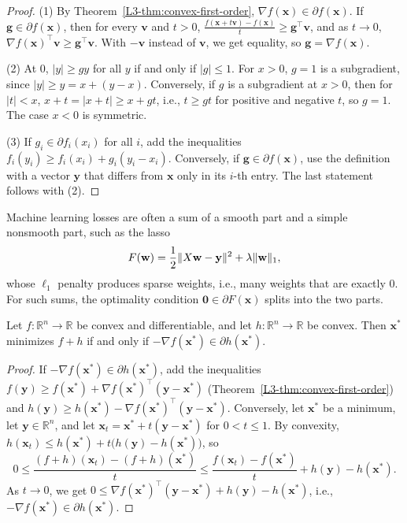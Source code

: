 \begin{proof}
    (1) By Theorem~\ref{L3-thm:convex-first-order}, $\nabla f(\mathbf{x}) \in \partial f(\mathbf{x})$. If $\mathbf{g} \in \partial f(\mathbf{x})$, then for every $\mathbf{v}$ and $t > 0$, $\frac{f(\mathbf{x} + t\mathbf{v}) - f(\mathbf{x})}{t} \geq \mathbf{g}^\top\mathbf{v}$, and as $t \to 0$, $\nabla f(\mathbf{x})^\top\mathbf{v} \geq \mathbf{g}^\top\mathbf{v}$. With $-\mathbf{v}$ instead of $\mathbf{v}$, we get equality, so $\mathbf{g} = \nabla f(\mathbf{x})$.

    (2) At $0$, $|y| \geq gy$ for all $y$ if and only if $|g| \leq 1$. For $x > 0$, $g = 1$ is a subgradient, since $|y| \geq y = x + (y - x)$. Conversely, if $g$ is a subgradient at $x > 0$, then for $|t| < x$, $x + t = |x + t| \geq x + gt$, i.e., $t \geq gt$ for positive and negative $t$, so $g = 1$. The case $x < 0$ is symmetric.

    (3) If $g_i \in \partial f_i(x_i)$ for all $i$, add the inequalities $f_i(y_i) \geq f_i(x_i) + g_i(y_i - x_i)$. Conversely, if $\mathbf{g} \in \partial f(\mathbf{x})$, use the definition with a vector $\mathbf{y}$ that differs from $\mathbf{x}$ only in its $i$-th entry. The last statement follows with (2).
\end{proof}

Machine learning losses are often a sum of a smooth part and a simple nonsmooth part, such as the lasso
\[F(\mathbf{w}) = \frac{1}{2}\lVert X\mathbf{w} - \mathbf{y} \rVert^2 + \lambda\lVert \mathbf{w} \rVert_1,\]
whose $\ell_1$ penalty produces sparse weights, i.e., many weights that are exactly $0$. For such sums, the optimality condition $\mathbf{0} \in \partial F(\mathbf{x})$ splits into the two parts.

\begin{theorem}\label{L3-thm:composite-optimality}
    Let $f: \mathbb{R}^n \to \mathbb{R}$ be convex and differentiable, and let $h: \mathbb{R}^n \to \mathbb{R}$ be convex. Then $\mathbf{x}^*$ minimizes $f + h$ if and only if $-\nabla f(\mathbf{x}^*) \in \partial h(\mathbf{x}^*)$.
\end{theorem}

\begin{proof}
    If $-\nabla f(\mathbf{x}^*) \in \partial h(\mathbf{x}^*)$, add the inequalities $f(\mathbf{y}) \geq f(\mathbf{x}^*) + \nabla f(\mathbf{x}^*)^\top(\mathbf{y} - \mathbf{x}^*)$ (Theorem~\ref{L3-thm:convex-first-order}) and $h(\mathbf{y}) \geq h(\mathbf{x}^*) - \nabla f(\mathbf{x}^*)^\top(\mathbf{y} - \mathbf{x}^*)$. Conversely, let $\mathbf{x}^*$ be a minimum, let $\mathbf{y} \in \mathbb{R}^n$, and let $\mathbf{x}_t = \mathbf{x}^* + t(\mathbf{y} - \mathbf{x}^*)$ for $0 < t \leq 1$. By convexity, $h(\mathbf{x}_t) \leq h(\mathbf{x}^*) + t\big(h(\mathbf{y}) - h(\mathbf{x}^*)\big)$, so
    \[0 \leq \frac{(f + h)(\mathbf{x}_t) - (f + h)(\mathbf{x}^*)}{t} \leq \frac{f(\mathbf{x}_t) - f(\mathbf{x}^*)}{t} + h(\mathbf{y}) - h(\mathbf{x}^*).\]
    As $t \to 0$, we get $0 \leq \nabla f(\mathbf{x}^*)^\top(\mathbf{y} - \mathbf{x}^*) + h(\mathbf{y}) - h(\mathbf{x}^*)$, i.e., $-\nabla f(\mathbf{x}^*) \in \partial h(\mathbf{x}^*)$.
\end{proof}


